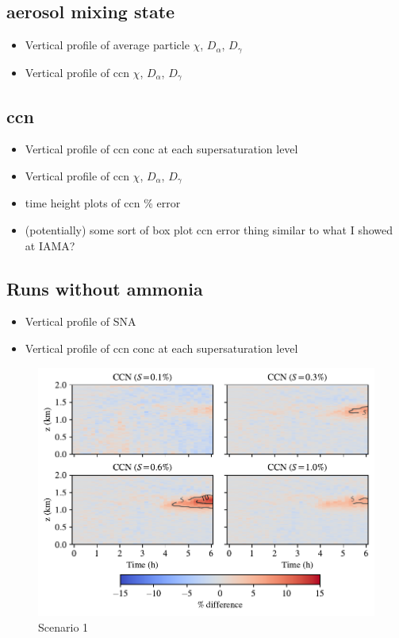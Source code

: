 \subsection{aerosol mixing state}

\begin{itemize}
\item Vertical profile of average particle $\chi$, $D_{\alpha}$, $D_{\gamma}$
\item Vertical profile of ccn $\chi$, $D_{\alpha}$, $D_{\gamma}$
\end{itemize}

\subsection{ccn}

\begin{itemize}
\item Vertical profile of ccn conc at each supersaturation level
\item Vertical profile of ccn $\chi$, $D_{\alpha}$, $D_{\gamma}$
\item time height plots of ccn \% error
\item (potentially) some sort of box plot ccn error thing similar to what I showed at IAMA?
\end{itemize}

\subsection{Runs without ammonia}

\begin{itemize}
\item Vertical profile of SNA
\item Vertical profile of ccn conc at each supersaturation level
\end{itemize}


\newpage
\begin{figure}[h]
  \centering
    \includegraphics[width=\textwidth]{figures/chapter5/height-time-ccn-pdiff-fx1fy0.pdf}
    \caption{Scenario 1}
    \label{fig:ht-ccn-pdiff-s1}
\end{figure}

